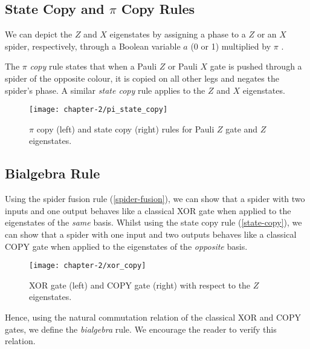 
\subsection{State Copy and $\pi$ Copy Rules}%

We can depict the $Z$ and $X$ eigenstates by assigning a phase to a $Z$ or an $X$ spider, respectively, through a Boolean variable $a$ (0 or 1) multiplied by $\pi$ \cite{Wetering2020}.

%

The $\pi$ \textit{copy} rule states that when a Pauli $Z$ or Pauli $X$ gate is pushed through a spider of the opposite colour, it is copied on all other legs and negates the spider's phase. A similar \textit{state copy} rule applies to the $Z$ and $X$ eigenstates.

\begin{figure}[H]
    \centering
    \texttt{[image: chapter-2/pi\_state\_copy]}
    \caption{$\pi$ copy (left) and state copy (right) rules for Pauli $Z$ gate and $Z$ eigenstates.}
    \label{state-copy}
    \label{pi-copy}
\end{figure}


\subsection{Bialgebra Rule}%
Using the spider fusion rule (\ref{spider-fusion}), we can show that a spider with two inputs and one output behaves like a classical XOR gate when applied to the eigenstates of the \textit{same} basis. Whilst using the state copy rule (\ref{state-copy}), we can show that a spider with one input and two outputs behaves like a classical COPY gate when applied to the eigenstates of the \textit{opposite} basis.

\begin{figure}[H]
    \centering
    \texttt{[image: chapter-2/xor\_copy]}
    \caption{XOR gate (left) and COPY gate (right) with respect to the $Z$ eigenstates.}
    \label{xor}
    \label{copy}
\end{figure}

Hence, using the natural commutation relation of the classical XOR and COPY gates, we define the \textit{bialgebra} rule. We encourage the reader to verify this relation.

